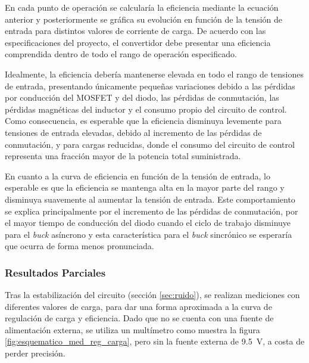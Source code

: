\documentclass[]{article}
\begin{document}
	En cada punto de operación se calcularía la eficiencia mediante la ecuación anterior y posteriormente se gráfica su evolución en función de la tensión de entrada para distintos valores de corriente de carga. De acuerdo con las especificaciones del proyecto, el convertidor debe presentar una eficiencia comprendida dentro de todo el rango de operación especificado.
	
	Idealmente, la eficiencia debería mantenerse elevada en todo el rango de tensiones de entrada, presentando únicamente pequeñas variaciones debido a las pérdidas por conducción del MOSFET y del diodo, las pérdidas de conmutación, las pérdidas magnéticas del inductor y el consumo propio del circuito de control. Como consecuencia, es esperable que la eficiencia disminuya levemente para tensiones de entrada elevadas, debido al incremento de las pérdidas de conmutación, y para cargas reducidas, donde el consumo del circuito de control representa una fracción mayor de la potencia total suministrada.
	
	En cuanto a la curva de eficiencia en función de la tensión de entrada, lo esperable es que la eficiencia se mantenga alta en la mayor parte del rango y disminuya suavemente al aumentar la tensión de entrada. Este comportamiento se explica principalmente por el incremento de las pérdidas de conmutación, por el mayor tiempo de conducción del diodo cuando el ciclo de trabajo disminuye para el \textit{buck} asíncrono y esta característica para el \textit{buck} sincrónico se esperaría que ocurra de forma menos pronunciada. 
	
	\subsubsection{Resultados Parciales}
	Tras la estabilización del circuito (sección \ref{sec:ruido}), se realizan mediciones con diferentes valores de carga, para dar una forma aproximada a la curva de regulación de carga y eficiencia. Dado que no se cuenta con una fuente de alimentación externa, se utiliza un multímetro como muestra la figura \ref{fig:esquematico_med_reg_carga}, pero sin la fuente externa de \SI{9.5}{V}, a costa de perder precisión.
	
\end{document}

